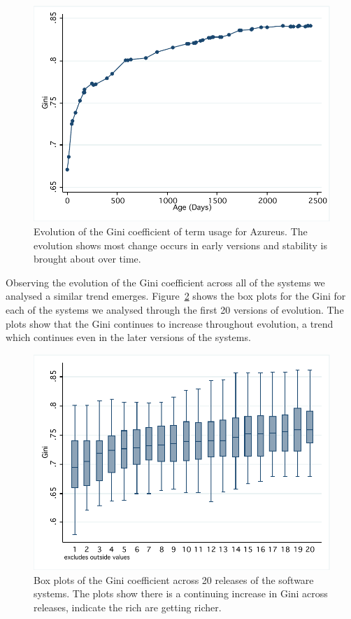 \begin{figure}[t]
\centering
\includegraphics[width=\textwidth]{Figures/Vocab-AzureusGini.pdf}
\caption{Evolution of the Gini coefficient of term usage for Azureus. The evolution shows most change occurs in early versions and stability is brought about over time.}
\label{fig:vocab-gini-azureus}
\end{figure}

Observing the evolution of the Gini coefficient across all of the systems we analysed a similar trend emerges. Figure~\ref{fig:vocab-gini-rsn20-box} shows the box plots for the Gini for each of the systems we analysed through the first 20 versions of evolution. The plots show that the Gini continues to increase throughout evolution, a trend which continues even in the later versions of the systems.

\begin{figure}[t]
\centering
\includegraphics[width=\textwidth]{Figures/Vocab-RSN20GiniBox.pdf}
\caption{Box plots of the Gini coefficient across 20 releases of the software systems. The plots show there is a continuing increase in Gini across releases, indicate the rich are getting richer.}
\label{fig:vocab-gini-rsn20-box}
\end{figure}

